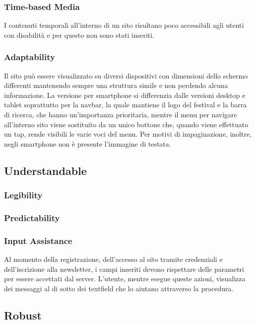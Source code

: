 \documentclass[10pt, a4paper]{article}
\begin{document}
\subsubsection{Time-based Media}
I contenuti temporali all'interno di un sito risultano poco accessibili agli utenti con disabilità e per questo non sono stati inseriti.

\subsubsection{Adaptability}

Il sito può essere visualizzato su diversi dispositivi con dimensioni dello schermo differenti mantenendo sempre una struttura simile e non perdendo alcuna informazione. La versione per smartphone si differenzia dalle versioni desktop e tablet soprattutto per la navbar, la quale mantiene il logo del festival e la barra di ricerca, che hanno un'importanza prioritaria, mentre il menu per navigare all'interno sito viene sostituito da un unico bottone che, quando viene effettuato un tap, rende visibili le varie voci del menu. Per motivi di impaginazione, inoltre, negli smartphone non è presente l’immagine di testata.

\subsection{Understandable}

\subsubsection{Legibility}


\subsubsection{Predictability}

\subsubsection{Input Assistance}
Al momento della registrazione, dell’accesso al sito tramite credenziali e dell’iscrizione alla newsletter, i campi inseriti devono rispettare delle parametri per essere accettati dal server. L’utente, mentre esegue queste azioni, visualizza dei messaggi al di sotto dei textfield che lo aiutano attraverso la procedura.

\subsection{Robust}
\end{document}
